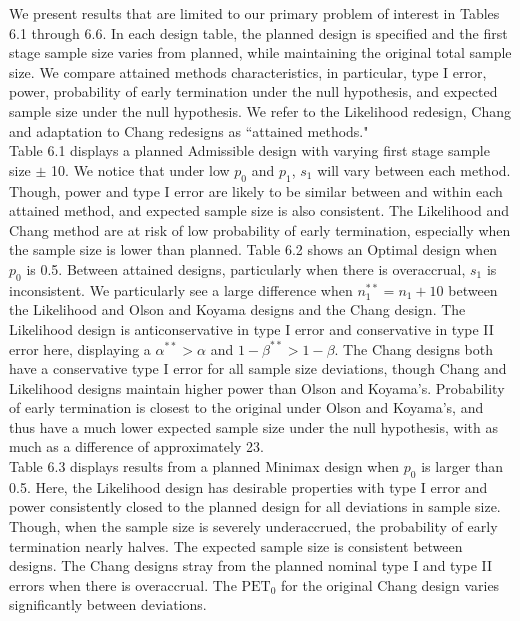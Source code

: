 \documentclass[12pt]{report}\usepackage[]{graphicx}\usepackage[]{color}
\newlength{\li}\setlength{\li}{14.48pt}
\newlength{\di}\setlength{\di}{-3.5mm}
\begin{document}
\indent We present results that are limited to our primary problem of interest in Tables 6.1 through 6.6. In each design table, the planned design is specified and the first stage sample size varies from planned, while maintaining the original total sample size. We compare attained methods characteristics, in particular, type I error, power, probability of early termination under the null hypothesis, and expected sample size under the null hypothesis. We refer to the Likelihood redesign, Chang and adaptation to Chang redesigns as ``attained methods." \\
\indent Table 6.1 displays a planned Admissible design with varying first stage sample size $\pm$ 10. We notice that under low $p_0$ and $p_1$, $s_1$ will vary between each method. Though, power and type I error are likely to be similar between and within each attained method, and expected sample size is also consistent. The Likelihood and Chang method are at risk of low probability of early termination, especially when the sample size is lower than planned. Table 6.2 shows an Optimal design when $p_0$ is 0.5. Between attained designs, particularly when there is overaccrual, $s_1$ is inconsistent. We particularly see a large difference when $n_1^{\ast\ast} = n_1 + 10$ between the Likelihood and Olson and Koyama designs and the Chang design.  The Likelihood design is anticonservative in type I error and conservative in type II error here, displaying a $\alpha^{\ast\ast} > \alpha$ and $1-\beta^{\ast\ast} > 1-\beta$. The Chang designs both have a conservative type I error for all sample size deviations, though Chang and Likelihood designs maintain higher power than Olson and Koyama's. Probability of early termination is closest to the original under Olson and Koyama's, and thus have a much lower expected sample size under the null hypothesis, with as much as a difference of approximately 23.\\
\indent Table 6.3 displays results from a planned Minimax design when $p_0$ is larger than 0.5. Here, the Likelihood design has desirable properties with type I error and power consistently closed to the planned design for all deviations in sample size. Though, when the sample size is severely underaccrued, the probability of early termination nearly halves. The expected sample size is consistent between designs. The Chang designs stray from the planned nominal type I and type II errors when there is overaccrual. The $\mbox{PET}_0$ for the original Chang design varies significantly between deviations. \\
\end{document}
